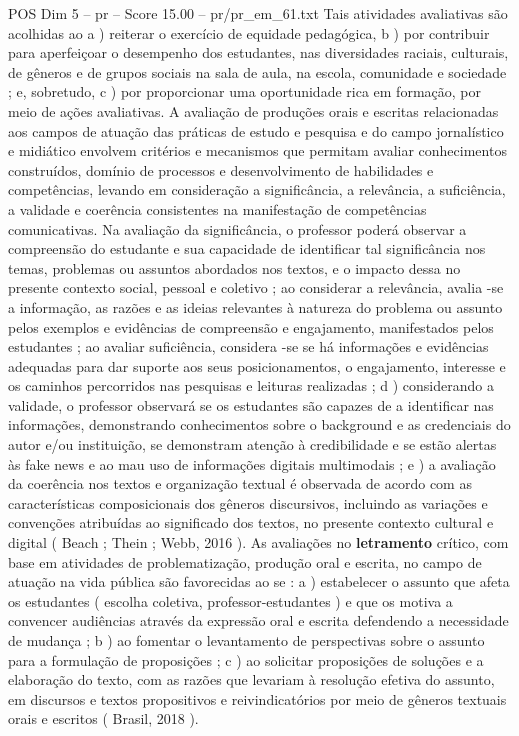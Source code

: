 \begin{textsample}{POS Dim 5 – pr – Score 15.00 – pr/pr\_em\_61.txt}
Tais atividades avaliativas são acolhidas ao a ) reiterar o exercício de equidade pedagógica, b ) por contribuir para aperfeiçoar o desempenho dos estudantes, nas diversidades raciais, culturais, de gêneros e de grupos sociais na sala de aula, na escola, comunidade e sociedade ; e, sobretudo, c ) por proporcionar uma oportunidade rica em formação, por meio de ações avaliativas.
A avaliação de produções orais e escritas relacionadas aos campos de atuação das práticas de estudo e pesquisa e do campo jornalístico e midiático envolvem critérios e mecanismos que permitam avaliar conhecimentos construídos, domínio de processos e desenvolvimento de habilidades e competências, levando em consideração a significância, a relevância, a suficiência, a validade e coerência consistentes na manifestação de competências comunicativas.
Na avaliação da significância, o professor poderá observar a compreensão do estudante e sua capacidade de identificar tal significância nos temas, problemas ou assuntos abordados nos textos, e o impacto dessa no presente contexto social, pessoal e coletivo ; ao considerar a relevância, avalia -se a informação, as razões e as ideias relevantes à natureza do problema ou assunto pelos exemplos e evidências de compreensão e engajamento, manifestados pelos estudantes ; ao avaliar suficiência, considera -se se há informações e evidências adequadas para dar suporte aos seus posicionamentos, o engajamento, interesse e os caminhos percorridos nas pesquisas e leituras realizadas ; d ) considerando a validade, o professor observará se os estudantes são capazes de a identificar nas informações, demonstrando conhecimentos sobre o background e as credenciais do autor e/ou instituição, se demonstram atenção à credibilidade e se estão alertas às fake news e ao mau uso de informações digitais multimodais ; e ) a avaliação da coerência nos textos e organização textual é observada de acordo com as características composicionais dos gêneros discursivos, incluindo as variações e convenções atribuídas ao significado dos textos, no presente contexto cultural e digital ( Beach ; Thein ; Webb, 2016 ).
As avaliações no \textbf{letramento} crítico, com base em atividades de problematização, produção oral e escrita, no campo de atuação na vida pública são favorecidas ao se : a ) estabelecer o assunto que afeta os estudantes ( escolha coletiva, professor-estudantes ) e que os motiva a convencer audiências através da expressão oral e escrita defendendo a necessidade de mudança ; b ) ao fomentar o levantamento de perspectivas sobre o assunto para a formulação de proposições ; c ) ao solicitar proposições de soluções e a elaboração do texto, com as razões que levariam à resolução efetiva do assunto, em discursos e textos propositivos e reivindicatórios por meio de gêneros textuais orais e escritos ( Brasil, 2018 ).

\end{textsample}
